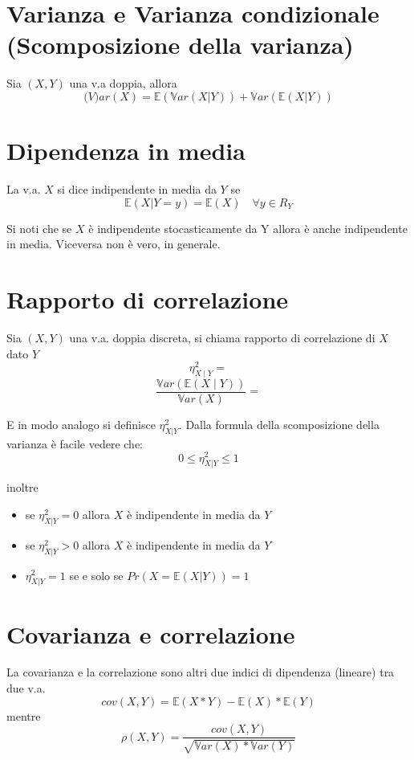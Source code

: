 \documentclass[a4paper]{report}
\begin{document}
  \section{Varianza e Varianza condizionale (Scomposizione della varianza)}
  Sia $(X,Y)$ una v.a doppia, allora
  \[ \mathbb(V)ar(X) = \mathbb{E}(\mathbb{V}ar(X|Y)) + \mathbb{V}ar(\mathbb{E}(X|Y)) \]

  \section{Dipendenza in media}
  La v.a. $X$ si dice indipendente in media da $Y$ se
  \[ \mathbb{E}(X|Y=y) = \mathbb{E}(X) \quad \forall y \in R_Y \]

  Si noti che se $X$ è indipendente stocasticamente da Y allora è anche indipendente in media. Viceversa non è vero, in generale.

  \section{Rapporto di correlazione}
  Sia $(X,Y)$ una v.a. doppia discreta, si chiama rapporto di correlazione di $X$ dato $Y$
  \[
  \eta^2_{X\mid Y} =
  \]
  \[
  \frac{ \mathbb{V}ar(\mathbb{E}(X \mid Y)) }{ \mathbb{V}ar(X) } =
  \]

  E in modo analogo si definisce $\eta_{X|Y}^2$. Dalla formula della scomposizione della varianza è facile vedere che:
  \[ 0 \leqslant \eta_{X|Y}^2 \leqslant 1 \]

  inoltre
  \begin{itemize}
    \item se $\eta_{X|Y}^2 = 0$ allora $X$ è indipendente in media da $Y$
    \item se $\eta_{X|Y}^2 > 0$ allora $X$ è indipendente in media da $Y$
    \item $\eta_{X|Y}^2 = 1$ se e solo se $Pr(X = \mathbb{E}(X|Y)) = 1$
  \end{itemize}

  \section{Covarianza e correlazione}
  La covarianza e la correlazione sono altri due indici di dipendenza (lineare) tra due v.a.
  \[ cov(X,Y) = \mathbb{E}(X * Y) - \mathbb{E}(X) * \mathbb{E}(Y) \]
  mentre
  \[ \rho(X,Y) = \frac{cov(X,Y)}{\sqrt{\mathbb{V}ar(X)*\mathbb{V}ar(Y)}} \]
\end{document}
